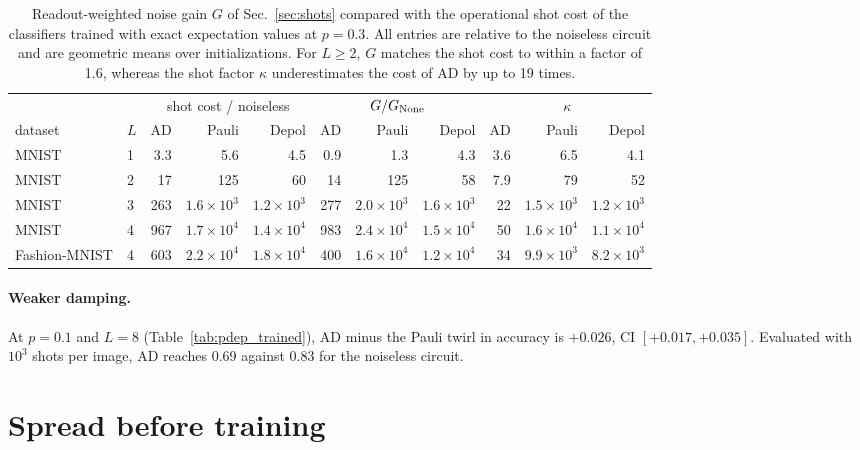 \documentclass[
 aps,pra,
 twocolumn,
 superscriptaddress,
 longbibliography,
 nofootinbib
]{revtex4-2}
\begin{document}
\begin{table}[t]
\caption{Readout-weighted noise gain $G$ of Sec.~\ref{sec:shots} compared with the
operational shot cost of the classifiers trained with exact expectation values at
$p=0.3$. All entries are relative to the noiseless circuit and are geometric means
over initializations. For $L\ge2$, $G$ matches the shot cost to within a factor of
1.6, whereas the shot factor $\kappa$ underestimates the cost of AD by up to 19 times.}
\label{tab:gain}
\begin{ruledtabular}
\begin{tabular}{llrrrrrrrrr}
 & & \multicolumn{3}{c}{shot cost / noiseless} & \multicolumn{3}{c}{$G/G_{\rm None}$} & \multicolumn{3}{c}{$\kappa$}\\
dataset & $L$ & AD & Pauli & Depol & AD & Pauli & Depol & AD & Pauli & Depol\\
\colrule
MNIST & 1 & 3.3 & 5.6 & 4.5 & 0.9 & 1.3 & 4.3 & 3.6 & 6.5 & 4.1\\
MNIST & 2 & 17 & 125 & 60 & 14 & 125 & 58 & 7.9 & 79 & 52\\
MNIST & 3 & 263 & $1.6\times10^3$ & $1.2\times10^3$ & 277 & $2.0\times10^3$ & $1.6\times10^3$ & 22 & $1.5\times10^3$ & $1.2\times10^3$\\
MNIST & 4 & 967 & $1.7\times10^4$ & $1.4\times10^4$ & 983 & $2.4\times10^4$ & $1.5\times10^4$ & 50 & $1.6\times10^4$ & $1.1\times10^4$\\
Fashion-MNIST & 4 & 603 & $2.2\times10^4$ & $1.8\times10^4$ & 400 & $1.6\times10^4$ & $1.2\times10^4$ & 34 & $9.9\times10^3$ & $8.2\times10^3$\\
\end{tabular}
\end{ruledtabular}
\end{table}

\paragraph{Weaker damping.}
At $p=0.1$ and $L=8$ (Table~\ref{tab:pdep_trained}), AD minus the Pauli twirl
in accuracy is $+0.026$, CI $[+0.017,+0.035]$. Evaluated with $10^3$ shots per
image, AD reaches 0.69 against 0.83 for the noiseless circuit.

\section{Spread before training}
\label{app:width}
\end{document}
